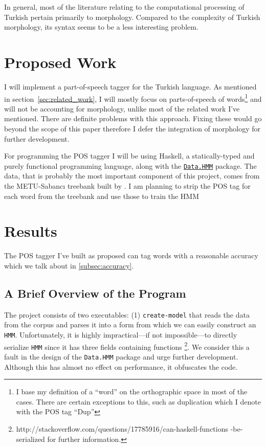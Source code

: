 \documentclass{article}
\newcommand{\hmmURL}{https://hackage.haskell.org/package/hmm-0.2.1.1/docs/Data-HMM.html}
\begin{document}
In general, most of the literature relating to the computational processing of
Turkish pertain primarily to morphology. Compared to the complexity of Turkish
morphology, its syntax seems to be a less interesting problem.

\section{Proposed Work}

I will implement a part-of-speech tagger for the Turkish language. As mentioned
in section~\ref{sec:related_work}, I will mostly focus on parts-of-speech of
words\footnote{I base my definition of a ``word'' on the orthographic space in
  most of the cases. There are certain exceptions to this, such as duplication
  which I denote with the POS tag ``Dup''} and will not be accounting for
morphology, unlike most of the related work I've mentioned. There are definite
problems with this approach. Fixing these would go beyond the scope of this
paper therefore I defer the integration of morphology for further development.

For programming the POS tagger I will be using Haskell, a statically-typed and
purely functional programming language, along with the
\href{\hmmURL}{\texttt{Data.HMM}} package. The data, that is probably the most
important component of this project, comes from the METU-Sabanc{\i} treebank
built by \citet{oflazer2003building}. I am planning to strip the POS tag for
each word from the treebank and use those to train the HMM

\section{Results}
The POS tagger I've built as proposed can tag words with a
reasonable accuracy which we talk about in \ref{subsec:accuracy}.

\subsection{A Brief Overview of the Program}
The project consists of two executables: (1) \texttt{create-model} that reads
the data from the corpus and parses it into a form from which we can easily
construct an \texttt{HMM}. Unfortunately, it is highly impractical---if not
impossible---to directly serialize \texttt{HMM} since it has three fields
containing functions
\footnote{http://stackoverflow.com/questions/17785916/can-haskell-functions
  -be-serialized for further information.}. We consider this a fault in the
design of the \texttt{Data.HMM} package and urge further development. Although
this has almost no effect on performance, it obfuscates the code.
\end{document}
